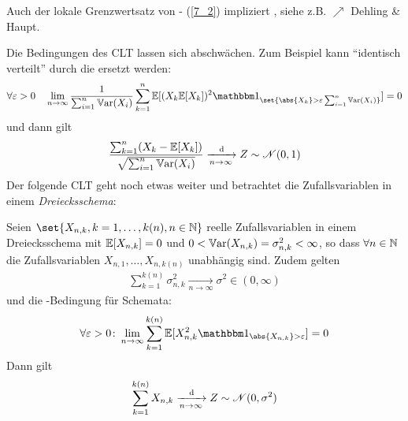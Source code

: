 \begin{*remark}
	Auch der lokale Grenzwertsatz von - (\cref{7_2}) impliziert , siehe z.B. $\nearrow$ Dehling \& Haupt.
\end{*remark}
Die Bedingungen des CLT lassen sich abschwächen. Zum Beispiel kann ``identisch verteilt'' durch die  ersetzt werden:
\begin{align*}
	\forall \epsilon > 0 \quad \lim_{n \to \infty} \frac{1}{\sum_{i=1}^n \Var(X_i)} \sum_{k=1}^n \E[(X_k \E[X_k])^2 \indi_{\set{\abs{X_k} > \epsilon \sum_{i=1}^n \Var(X_i)}}] = 0
\end{align*}
und dann gilt
\begin{align*}
	\frac{\sum_{k=1}^n (X_k - \mathbb{E}[X_k])}{\sqrt{\sum_{i=1}^n \mathbb{V}\text{ar}(X_i)}} \xrightarrow[n \to \infty]{\,\mathrm{d}} Z \sim \mathscr N(0,1)
\end{align*}
Der folgende CLT geht noch etwas weiter und  betrachtet die Zufallsvariablen in einem \emph{Dreiecksschema}:
\begin{proposition}
	Seien $\set{X_{n,k}, k=1,\dots,k(n),n \in \N}$ reelle Zufallsvariablen in einem Dreiecksschema mit $\mathbb{E}[X_{n,k}] = 0$ und $0 < \mathbb{V}\text{ar}(X_{n,k}) = \sigma_{n,k}^2 < \infty$, so dass $\forall n \in \mathbb{N}$ die Zufallsvariablen $X_{n,1}, \dots, X_{n,k(n)}$ unabhängig sind. Zudem gelten
	\begin{align*}
		\sum_{k=1}^{k(n)} \sigma_{n,k}^2 \xrightarrow[n \to \infty]{} \sigma^2 \in (0,\infty)
	\end{align*}
	und die -Bedingung für Schemata:
	\begin{align*}
		\forall \epsilon >0 \colon \lim_{n \to \infty} \sum_{k=1}^{k(n)} \E[X_{n,k}^2 \indi_{\abs{X_{n,k}}> \epsilon}] = 0
	\end{align*}
	Dann gilt
	\begin{align*}
		\sum_{k=1}^{k(n)} X_{n,k} \xrightarrow[n \to \infty]{\,\mathrm{d}} Z \sim \mathscr N(0, \sigma^2) 
	\end{align*}
\end{proposition}
